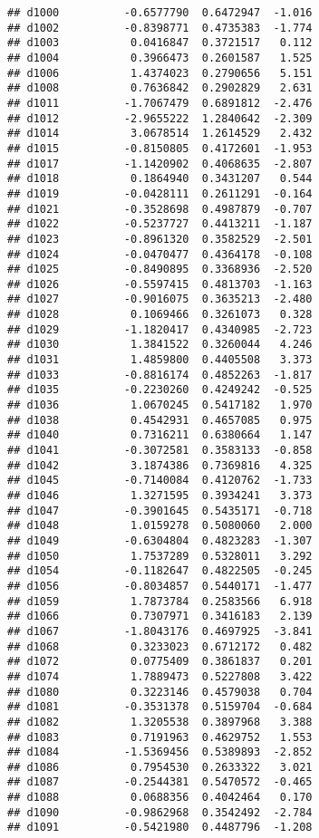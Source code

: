 \documentclass[
]{article}
\begin{document}
\begin{verbatim}
## d1000          -0.6577790  0.6472947  -1.016
## d1002          -0.8398771  0.4735383  -1.774
## d1003           0.0416847  0.3721517   0.112
## d1004           0.3966473  0.2601587   1.525
## d1006           1.4374023  0.2790656   5.151
## d1008           0.7636842  0.2902829   2.631
## d1011          -1.7067479  0.6891812  -2.476
## d1012          -2.9655222  1.2840642  -2.309
## d1014           3.0678514  1.2614529   2.432
## d1015          -0.8150805  0.4172601  -1.953
## d1017          -1.1420902  0.4068635  -2.807
## d1018           0.1864940  0.3431207   0.544
## d1019          -0.0428111  0.2611291  -0.164
## d1021          -0.3528698  0.4987879  -0.707
## d1022          -0.5237727  0.4413211  -1.187
## d1023          -0.8961320  0.3582529  -2.501
## d1024          -0.0470477  0.4364178  -0.108
## d1025          -0.8490895  0.3368936  -2.520
## d1026          -0.5597415  0.4813703  -1.163
## d1027          -0.9016075  0.3635213  -2.480
## d1028           0.1069466  0.3261073   0.328
## d1029          -1.1820417  0.4340985  -2.723
## d1030           1.3841522  0.3260044   4.246
## d1031           1.4859800  0.4405508   3.373
## d1033          -0.8816174  0.4852263  -1.817
## d1035          -0.2230260  0.4249242  -0.525
## d1036           1.0670245  0.5417182   1.970
## d1038           0.4542931  0.4657085   0.975
## d1040           0.7316211  0.6380664   1.147
## d1041          -0.3072581  0.3583133  -0.858
## d1042           3.1874386  0.7369816   4.325
## d1045          -0.7140084  0.4120762  -1.733
## d1046           1.3271595  0.3934241   3.373
## d1047          -0.3901645  0.5435171  -0.718
## d1048           1.0159278  0.5080060   2.000
## d1049          -0.6304804  0.4823283  -1.307
## d1050           1.7537289  0.5328011   3.292
## d1054          -0.1182647  0.4822505  -0.245
## d1056          -0.8034857  0.5440171  -1.477
## d1059           1.7873784  0.2583566   6.918
## d1066           0.7307971  0.3416183   2.139
## d1067          -1.8043176  0.4697925  -3.841
## d1068           0.3233023  0.6712172   0.482
## d1072           0.0775409  0.3861837   0.201
## d1074           1.7889473  0.5227808   3.422
## d1080           0.3223146  0.4579038   0.704
## d1081          -0.3531378  0.5159704  -0.684
## d1082           1.3205538  0.3897968   3.388
## d1083           0.7191963  0.4629752   1.553
## d1084          -1.5369456  0.5389893  -2.852
## d1086           0.7954530  0.2633322   3.021
## d1087          -0.2544381  0.5470572  -0.465
## d1088           0.0688356  0.4042464   0.170
## d1090          -0.9862968  0.3542492  -2.784
## d1091          -0.5421980  0.4487796  -1.208

\end{verbatim}
\end{document}
